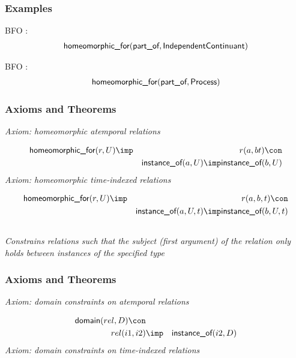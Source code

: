 \subsubsection{Examples}
\begin{clist}
\item BFO : \begin{eqnarray*}
 \mbox{\sf homeomorphic\_for}( \mbox{\sf part\_of},  \mbox{\sf IndependentContinuant}) 
\end{eqnarray*}

\item BFO : \begin{eqnarray*}
 \mbox{\sf homeomorphic\_for}( \mbox{\sf part\_of},  \mbox{\sf Process}) 
\end{eqnarray*}

\end{clist}

\subsubsection{Axioms and Theorems}


\emph{Axiom: homeomorphic atemporal relations}

\begin{eqnarray*}
 \pr{homeomorphic\_for}(r, U) &\imp &r(a, bt) \con \\
&& \pr{instance\_of}(a, U) \imp  \pr{instance\_of}(b, U) 
\end{eqnarray*}
\emph{Axiom: homeomorphic time-indexed relations}

\begin{eqnarray*}
 \pr{homeomorphic\_for}(r, U) &\imp &r(a, b, t) \con \\
&& \pr{instance\_of}(a, U, t) \imp  \pr{instance\_of}(b, U, t) 
\end{eqnarray*}

\subsection{ }
\emph{Constrains relations such that the subject (first argument) of the relation only holds between instances of the specified type}

\subsubsection{Axioms and Theorems}


\emph{Axiom: domain constraints on atemporal relations}

\begin{eqnarray*}
 \pr{domain}(rel, D) \con \\
rel(i1, i2) &\imp & \pr{instance\_of}(i2, D) 
\end{eqnarray*}
\emph{Axiom: domain constraints on time-indexed relations}

